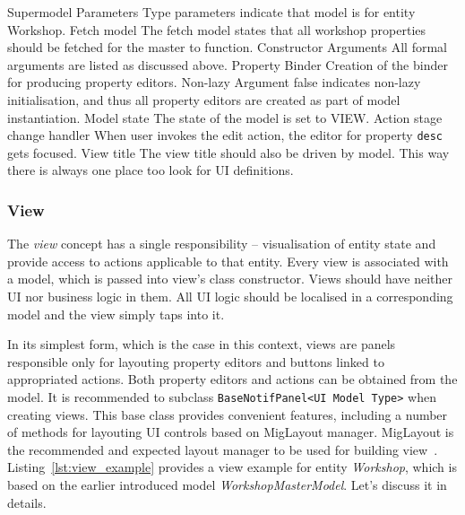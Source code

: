     {Supermodel Parameters}
    {Type parameters indicate that model is for entity Workshop.}
    {Fetch model}
    {The fetch model states that all workshop properties should be fetched for the master to function.}
    {Constructor Arguments}
    {All formal arguments are listed as discussed above.}
    {Property Binder}
    {Creation of the binder for producing property editors.}
    {Non-lazy}
    {Argument false indicates non-lazy initialisation, and thus all property editors are created as part of model instantiation.}
    {Model state}
    {The state of the model is set to VIEW.}
    {Action stage change handler}
    {When user invokes the edit action, the editor for property \texttt{desc} gets focused.}
    {View title}
    {The view title should also be driven by model. This way there is always one place too look for UI definitions.}
    
  
  \subsubsection{View}
  
  The \emph{view} concept has a single responsibility -- visualisation of entity state and provide access to actions applicable to that entity.
  Every view is associated with a model, which is passed into view's class constructor.
  Views should have neither UI nor business logic in them.
  All UI logic should be localised in a corresponding model and the view simply taps into it.
  
  In its simplest form, which is the case in this context, views are panels responsible only for layouting property editors and buttons linked to appropriated actions.
  Both property editors and actions can be obtained from the model.  
  It is recommended to subclass \texttt{BaseNotifPanel<UI Model Type>} when creating views.
  This base class provides convenient features, including a number of methods for layouting UI controls based on MigLayout manager.
  MigLayout is the recommended and expected layout manager to be used for building view~\cite{MigLayout}.
  Listing~\ref{lst:view_example} provides a view example for entity \emph{Workshop}, which is based on the earlier introduced model \emph{WorkshopMasterModel}.
  Let's discuss it in details.  
  
